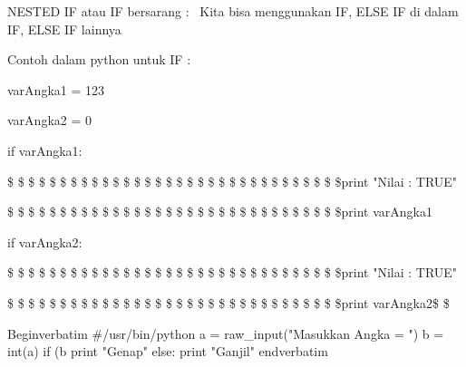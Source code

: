 \vspace{12pt}
\noindent 
NESTED IF atau IF bersarang :~ Kita bisa menggunakan IF, ELSE IF di dalam IF, ELSE IF lainnya \par
\vspace{12pt}
\noindent 
Contoh dalam python untuk IF :  \par
\vspace{12pt}
\noindent 
varAngka1 = 123 \par
\vspace{12pt}
\noindent 
varAngka2 = 0 \par
\vspace{12pt}
\noindent 
if varAngka1: \par
\vspace{12pt}
\noindent 
 \$  \$ \$  \$ \$  \$ \$  \$ \$ \$ \$  \$ \$  \$ \$  \$ \$  \$ \$  \$ \$  \$ \$  \$ \$  \$ \$  \$ \$  \$ \$  \$print "Nilai : TRUE" \par
\vspace{12pt}
\noindent 
 \$  \$ \$  \$ \$  \$ \$  \$ \$  \$ \$  \$ \$  \$ \$  \$ \$  \$ \$  \$ \$  \$ \$  \$ \$  \$ \$  \$ \$  \$ \$  \$print varAngka1 \par
\vspace{12pt}
\noindent 
if varAngka2: \par
\vspace{12pt}
\noindent 
 \$  \$ \$  \$ \$  \$ \$  \$ \$ \$ \$  \$ \$  \$ \$  \$ \$  \$ \$  \$ \$  \$ \$  \$ \$  \$ \$  \$ \$  \$ \$  \$print "Nilai : TRUE" \par
\vspace{12pt}
\noindent 
 \$  \$ \$  \$ \$  \$ \$  \$ \$ \$ \$  \$ \$  \$ \$  \$ \$  \$ \$  \$ \$  \$ \$  \$ \$  \$ \$  \$ \$  \$ \$  \$print varAngka2{\fontsize{14pt}{14pt}\selectfont  \$  \$ \\} \par
\vspace{12pt}
\noindent 
Begin{verbatim}
#/usr/bin/python
a = raw_input("Masukkan Angka = ")
b = int(a)
if (b%
        print "Genap"
else:
        print "Ganjil"
end{verbatim}


